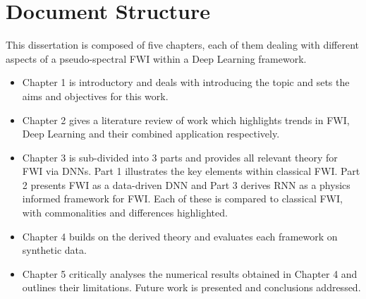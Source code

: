 \section{Document Structure}
This dissertation is composed of five chapters, each of them dealing with different aspects of a pseudo-spectral FWI within a Deep Learning framework.
\begin{itemize}
    \item Chapter 1 is introductory and deals with introducing the topic and sets the aims and objectives for this work. 
    \item Chapter 2 gives a literature review of work which highlights trends in FWI, Deep Learning and their combined application respectively. 
    \item Chapter 3 is sub-divided into 3 parts and provides all relevant theory for FWI via DNNs. Part 1 illustrates the key elements within classical FWI. Part 2 presents FWI as a data-driven \ac{DNN} and Part 3 derives RNN as a physics informed framework for FWI. Each of these is compared to classical FWI, with commonalities and differences highlighted.
    \item Chapter 4 builds on the derived theory and evaluates each framework on synthetic data.
    \item Chapter 5 critically analyses the numerical results obtained in Chapter 4 and outlines their limitations. Future work is presented and conclusions addressed.
\end{itemize}